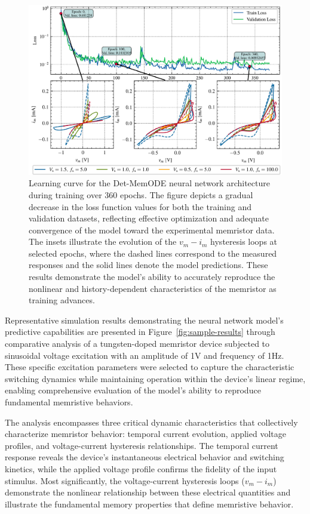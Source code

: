 \documentclass[lettersize,journal]{IEEEtran}
\begin{document}
\begin{figure}[!t]
  \centering
  \includegraphics[width=\linewidth]{figs/Training_process.pdf}
  \caption{Learning curve for the Det-MemODE neural network architecture during training over 360 epochs. The figure depicts a gradual decrease in the loss function values for both the training and validation datasets, reflecting effective optimization and adequate convergence of the model toward the experimental memristor data. The insets illustrate the evolution of the \( v_m - i_m \) hysteresis loops at selected epochs, where the dashed lines correspond to the measured responses and the solid lines denote the model predictions. These results demonstrate the model’s ability to accurately reproduce the nonlinear and history-dependent characteristics of the memristor as training advances.}
  \label{fig:learning-curve}
\end{figure}



Representative simulation results demonstrating the neural network model's predictive capabilities are presented in Figure~\ref{fig:sample-results} through comparative analysis of a tungsten-doped memristor device subjected to sinusoidal voltage excitation with an amplitude of 1V and frequency of 1Hz. These specific excitation parameters were selected to capture the characteristic switching dynamics while maintaining operation within the device's linear regime, enabling comprehensive evaluation of the model's ability to reproduce fundamental memristive behaviors.

The analysis encompasses three critical dynamic characteristics that collectively characterize memristor behavior: temporal current evolution, applied voltage profiles, and voltage-current hysteresis relationships. The temporal current response reveals the device's instantaneous electrical behavior and switching kinetics, while the applied voltage profile confirms the fidelity of the input stimulus. Most significantly, the voltage-current hysteresis loops (\(v_m - i_m\)) demonstrate the nonlinear relationship between these electrical quantities and illustrate the fundamental memory properties that define memristive behavior.
\end{document}

